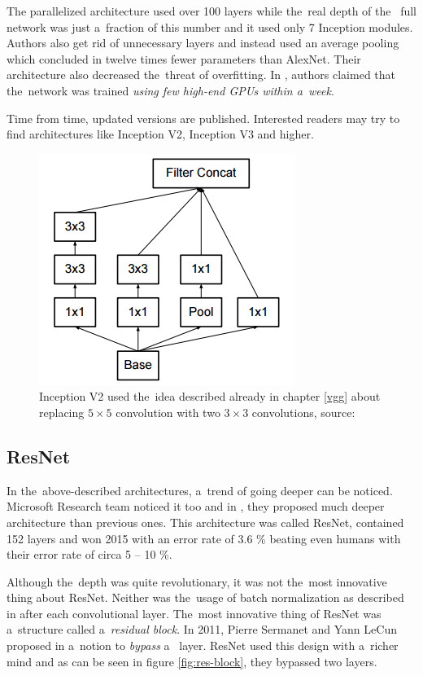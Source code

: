 The parallelized architecture used over 100 layers while the~real depth of the~
full network was just a~fraction of this number and it used only 7 Inception 
modules. Authors also get rid of unnecessary  layers and instead used an 
average pooling which concluded in twelve times fewer parameters than AlexNet. 
Their architecture also decreased the~threat of overfitting. In 
\cite{googlenet}, authors claimed that the~network was trained \textit{using few 
high-end GPUs within a~week}.

Time from time, updated versions are published. Interested readers may try to 
find architectures like Inception V2, Inception V3 and higher.

\begin{figure}[H]
   \centering
	\includegraphics[width=0.3\linewidth]{./pictures/inception-v2.png}
	\caption[Inception V2]{Inception V2 used the~idea described already in chapter 
\ref{vgg} about replacing $5 \times 5$ convolution with two $3 \times 3$ 
convolutions, source: \cite{inception-v2}}
      \label{fig:inception-v2}
\end{figure}


\subsection{ResNet}
\label{resnet}

In the~above-described architectures, a~trend of going deeper can be noticed. 
Microsoft Research team noticed it too and in \cite{resnet}, they proposed much 
deeper architecture than previous ones. This architecture was called ResNet, 
contained 152 layers and won  2015 with an error rate of 3.6 \% 
beating even humans with their error rate of circa 5 -- 10 \%.

Although the~depth was quite revolutionary, it was not the~most innovative thing 
about ResNet. Neither was the~usage of batch normalization as described in 
\cite{batch-norm} after each convolutional layer. The~most innovative thing of 
ResNet was a~structure called a~\textit{residual block}. In 2011, Pierre 
Sermanet and Yann LeCun proposed in \cite{bypass} a~notion to \textit{bypass} a~
layer. ResNet used this design with a~richer mind and as can be seen in figure 
\ref{fig:res-block}, they bypassed two layers.

